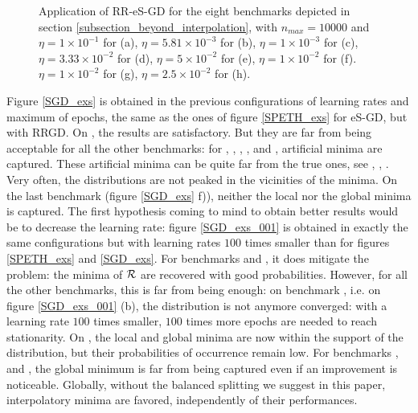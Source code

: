 \documentclass[article,authoryear,jmlmc]{beg_32}             %
\begin{document}
\begin{figure}[h!]
	\centering
	\scalebox{0.60}{}
        \caption{
          Application of RR-eS-GD for the eight benchmarks depicted in section \ref{subsection_beyond_interpolation}, with $n_{max}=10000$ and
 $\eta = 1   \times 10^{-1}$  for \exOne    (a),
 $\eta = 5.81\times 10^{-3}$  for \exTwo    (b),
 $\eta = 1   \times 10^{-3}$  for \exThree  (c),
 $\eta = 3.33\times 10^{-2}$  for \exFour   (d),
 $\eta = 5   \times 10^{-2}$  for \exFive   (e),
 $\eta = 1   \times 10^{-2}$  for \exSix    (f).
 $\eta = 1   \times 10^{-2}$  for \exSeven  (g),
 $\eta = 2.5 \times 10^{-2}$  for \exHeight (h).
}
	\label{RR_SPETH_exs}
\end{figure}



Figure \ref{SGD_exs} is obtained in the previous configurations of learning rates and maximum of epochs, the same as the ones of figure \ref{SPETH_exs} for eS-GD, but with RRGD. 
On \exTwo, the results are satisfactory. But they are far from being acceptable for all the other benchmarks: for \exOne, \exThree, \exFour, \exFive, \exSeven and \exHeight,
artificial minima are captured. These artificial minima can be quite far from the true ones, see \exFour, \exSeven, \exHeight.    
Very often, the distributions are not peaked in the vicinities of the minima.
On the last benchmark (figure \ref{SGD_exs} f)), neither the local nor the global minima is captured. 
The first hypothesis coming to mind to obtain better results would be to decrease the learning rate: figure \ref{SGD_exs_001} is obtained in exactly the same configurations but
with learning rates $100$ times smaller than for figures \ref{SPETH_exs} and \ref{SGD_exs}. 
For benchmarks \exOne and \exFour, it does mitigate the problem: the minima of $\mathcal{R}$ are recovered with good probabilities. 
However, for all the other benchmarks, this is far from being enough: on benchmark \exTwo, i.e. on figure \ref{SGD_exs_001} (b), the distribution is not anymore
converged: with a  learning rate $100$ times smaller, $100$ times more epochs are needed to reach stationarity.
On \exThree, the local and global minima are now within the support of the distribution, but their probabilities of occurrence remain low.
For benchmarks \exFive, \exSeven and \exHeight, the global minimum is far from being captured even if an improvement is noticeable. 
Globally, without the balanced splitting we suggest in this paper, interpolatory minima are favored, independently of their performances.  
\end{document}
